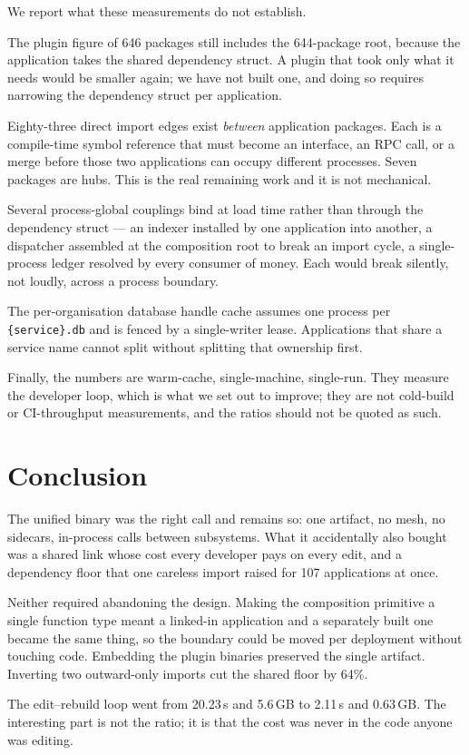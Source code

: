 \documentclass[11pt]{article}
\begin{document}
We report what these measurements do not establish.

The plugin figure of 646 packages still includes the 644-package root, because
the application takes the shared dependency struct. A plugin that took only what
it needs would be smaller again; we have not built one, and doing so requires
narrowing the dependency struct per application.

Eighty-three direct import edges exist \emph{between} application packages.
Each is a compile-time symbol reference that must become an interface, an RPC
call, or a merge before those two applications can occupy different processes.
Seven packages are hubs. This is the real remaining work and it is not
mechanical.

Several process-global couplings bind at load time rather than through the
dependency struct --- an indexer installed by one application into another, a
dispatcher assembled at the composition root to break an import cycle, a
single-process ledger resolved by every consumer of money. Each would break
silently, not loudly, across a process boundary.

The per-organisation database handle cache assumes one process per
\texttt{\{service\}.db} and is fenced by a single-writer lease. Applications
that share a service name cannot split without splitting that ownership first.

Finally, the numbers are warm-cache, single-machine, single-run. They measure
the developer loop, which is what we set out to improve; they are not
cold-build or CI-throughput measurements, and the ratios should not be quoted
as such.

\section{Conclusion}

The unified binary was the right call and remains so: one artifact, no mesh, no
sidecars, in-process calls between subsystems. What it accidentally also bought
was a shared link whose cost every developer pays on every edit, and a
dependency floor that one careless import raised for 107 applications at once.

Neither required abandoning the design. Making the composition primitive a
single function type meant a linked-in application and a separately built one
became the same thing, so the boundary could be moved per deployment without
touching code. Embedding the plugin binaries preserved the single artifact.
Inverting two outward-only imports cut the shared floor by 64\%.

The edit--rebuild loop went from 20.23\,s and 5.6\,GB to 2.11\,s and 0.63\,GB.
The interesting part is not the ratio; it is that the cost was never in the code
anyone was editing.
\end{document}
